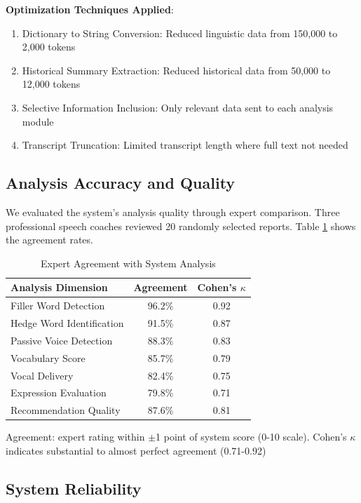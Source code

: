 \documentclass[conference]{IEEEtran}
\begin{document}
\textbf{Optimization Techniques Applied}:
\begin{enumerate}
    \item Dictionary to String Conversion: Reduced linguistic data from 150,000 to 2,000 tokens
    \item Historical Summary Extraction: Reduced historical data from 50,000 to 12,000 tokens
    \item Selective Information Inclusion: Only relevant data sent to each analysis module
    \item Transcript Truncation: Limited transcript length where full text not needed
\end{enumerate}

\subsection{Analysis Accuracy and Quality}

We evaluated the system's analysis quality through expert comparison. Three professional speech coaches reviewed 20 randomly selected reports. Table \ref{tab:accuracy} shows the agreement rates.

\begin{table}[htbp]
\caption{Expert Agreement with System Analysis}
\begin{center}
\begin{tabular}{|l|c|c|}
\hline
\textbf{Analysis Dimension} & \textbf{Agreement} & \textbf{Cohen's $\kappa$} \\
\hline
Filler Word Detection & 96.2\% & 0.92 \\
Hedge Word Identification & 91.5\% & 0.87 \\
Passive Voice Detection & 88.3\% & 0.83 \\
Vocabulary Score & 85.7\% & 0.79 \\
Vocal Delivery & 82.4\% & 0.75 \\
Expression Evaluation & 79.8\% & 0.71 \\
Recommendation Quality & 87.6\% & 0.81 \\
\hline
\end{tabular}
\label{tab:accuracy}
\end{center}
\footnotesize{Agreement: expert rating within $\pm$1 point of system score (0-10 scale). Cohen's $\kappa$ indicates substantial to almost perfect agreement (0.71-0.92)}
\end{table}

\subsection{System Reliability}
\end{document}
